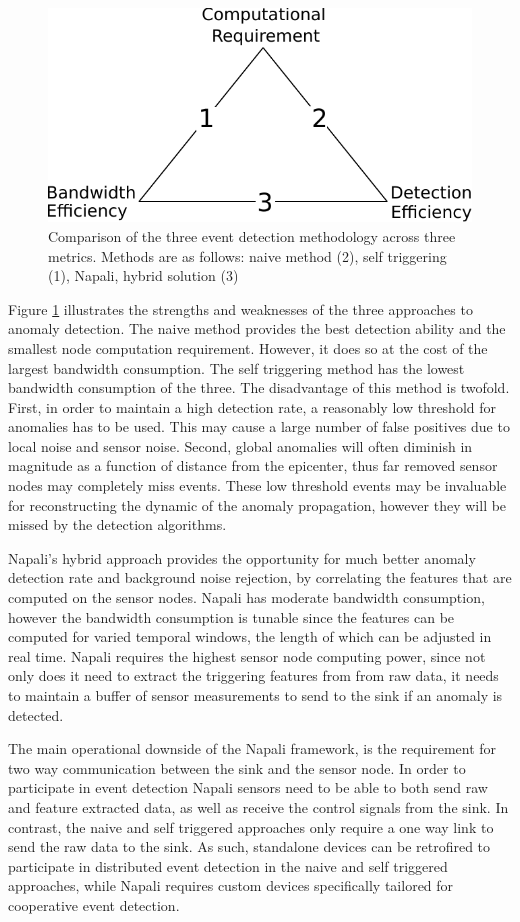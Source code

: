 \begin{figure}[h]
    \centering
    \includegraphics[width=0.5\linewidth]{img/edge_computing_vs.pdf}
    \caption{Comparison of the three event detection methodology across three metrics.
    Methods are as follows: naive method (2), self triggering (1), Napali, hybrid solution (3)}
    \label{intro:fig:edge}
\end{figure}
Figure \ref{intro:fig:edge} illustrates the strengths and weaknesses of the three approaches to anomaly detection.
The naive method provides the best detection ability and the smallest node computation requirement.
However, it does so at the cost of the largest bandwidth consumption.
The self triggering method has the lowest bandwidth consumption of the three.
The disadvantage of this method is twofold.
First, in order to maintain a high detection rate, a reasonably low threshold for anomalies has to be used.
This may cause a large number of false positives due to local noise and sensor noise.
Second, global anomalies will often diminish in magnitude as a function of distance from the epicenter, thus far removed sensor nodes may completely miss events.
These low threshold events may be invaluable for reconstructing the dynamic of the anomaly propagation, however they will be missed by the detection algorithms.


Napali's hybrid approach provides the opportunity for much better anomaly detection rate and background noise rejection, by correlating the features that are computed on the sensor nodes.
Napali has moderate bandwidth consumption, however the bandwidth consumption is tunable since the features can be computed for varied temporal windows, the length of which can be adjusted in real time.
Napali requires the highest sensor node computing power, since not only does it need to extract the triggering features from from raw data, it needs to maintain a buffer of sensor measurements to send to the sink if an anomaly is detected.

The main operational downside of the Napali framework, is the requirement for two way communication between the sink and the sensor node.
In order to participate in event detection Napali sensors need to be able to both send raw and feature extracted data, as well as receive the control signals from the sink.
In contrast, the naive and self triggered approaches only require a one way link to send the raw data to the sink.
As such, standalone devices can be retrofired to participate in distributed event detection in the naive and self triggered approaches, while Napali requires custom devices specifically tailored for cooperative event detection.

